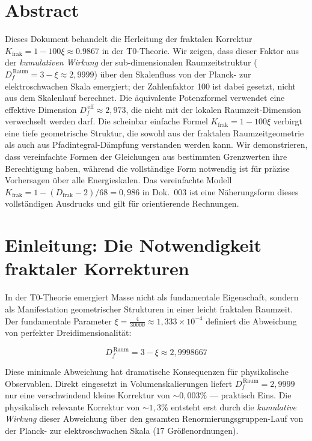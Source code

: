 \section*{Abstract}
		Dieses Dokument behandelt die Herleitung der fraktalen Korrektur $K_{\text{frak}} = 1 - 100\xi \approx 0.9867$ in der T0-Theorie. Wir zeigen, dass dieser Faktor aus der \emph{kumulativen Wirkung} der sub-dimensionalen Raumzeitstruktur ($D_f^{\,\text{Raum}} = 3 - \xi \approx 2{,}9999$) über den Skalenfluss von der Planck- zur elektroschwachen Skala emergiert; der Zahlenfaktor 100 ist dabei gesetzt, nicht aus dem Skalenlauf berechnet. Die äquivalente Potenzformel verwendet eine effektive Dimension $D_f^{\,\text{eff}} \approx 2{,}973$, die nicht mit der lokalen Raumzeit-Dimension verwechselt werden darf. Die scheinbar einfache Formel $K_{\text{frak}} = 1 - 100\xi$ verbirgt eine tiefe geometrische Struktur, die sowohl aus der fraktalen Raumzeitgeometrie als auch aus Pfadintegral-Dämpfung verstanden werden kann. Wir demonstrieren, dass vereinfachte Formen der Gleichungen aus bestimmten Grenzwerten ihre Berechtigung haben, während die vollständige Form notwendig ist für präzise Vorhersagen über alle Energieskalen. Das vereinfachte Modell $K_{\text{frak}} = 1 - (D_{\text{frak}}-2)/68 = 0{,}986$ in Dok.~003 ist eine Näherungsform dieses vollständigen Ausdrucks und gilt für orientierende Rechnungen.

	
	\setcounter{tocdepth}{3}  %
	
	\section{Einleitung: Die Notwendigkeit fraktaler Korrekturen}
	
	In der T0-Theorie emergiert Masse nicht als fundamentale Eigenschaft, sondern als Manifestation geometrischer Strukturen in einer leicht fraktalen Raumzeit. Der fundamentale Parameter $\xi = \frac{4}{30000} \approx 1{,}333 \times 10^{-4}$ definiert die Abweichung von perfekter Dreidimensionalität:
	
	\begin{equation}
		D_f^{\,\text{Raum}} = 3 - \xi \approx 2{,}9998667
		\label{eq:Df_def}
	\end{equation}
	
	Diese minimale Abweichung hat dramatische Konsequenzen für physikalische Observablen. Direkt eingesetzt in Volumenskalierungen liefert $D_f^{\,\text{Raum}} = 2{,}9999$ nur eine verschwindend kleine Korrektur von $\sim 0{,}003\%$ --- praktisch Eins. Die physikalisch relevante Korrektur von $\sim 1{,}3\%$ entsteht erst durch die \emph{kumulative Wirkung} dieser Abweichung über den gesamten Renormierungsgruppen-Lauf von der Planck- zur elektroschwachen Skala (17 Größenordnungen).
	
